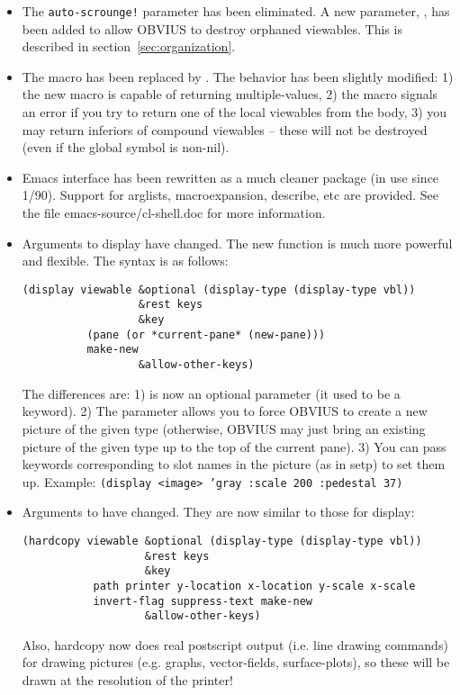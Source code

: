 \begin{itemize}
\item The {\tt *auto-scrounge!} parameter has been eliminated.  A new
parameter, , has been added to allow
OBVIUS to destroy orphaned viewables.  This is described in
section~\ref{sec:organization}.

\item The macro  has been replaced by
.  The behavior has been slightly modified:
1) the new macro is capable of returning multiple-values, 2) the macro
signals an error if you try to return one of the local viewables from
the body, 3) you may return inferiors of compound viewables -- these
will not be destroyed (even if the global symbol
 is non-nil).

\item Emacs interface has been rewritten as a much cleaner package (in use
since 1/90).  Support for arglists, macroexpansion, describe, etc are
provided.  See the file emacs-source/cl-shell.doc for more
information.

\item Arguments to display have changed.  The new function is much
more powerful and flexible.  The syntax is as follows:
\begin{verbatim}
(display viewable &optional (display-type (display-type vbl))
                  &rest keys
                  &key 
		  (pane (or *current-pane* (new-pane)))
		  make-new
                  &allow-other-keys)
\end{verbatim}
The differences are: 1)  is now an optional
parameter (it used to be a keyword).  2) The 
parameter allows you to force OBVIUS to create a new picture of the
given type (otherwise, OBVIUS may just bring an existing picture of
the given type up to the top of the current pane).  3) You can pass
keywords corresponding to slot names in the picture (as in setp) to
set them up.  Example: {\tt (display <image> 'gray :scale 200
:pedestal 37)}

\item Arguments to  have changed.  They are now similar
to those for display:
\begin{verbatim}
(hardcopy viewable &optional (display-type (display-type vbl))
                   &rest keys
                   &key
		   path printer y-location x-location y-scale x-scale
		   invert-flag suppress-text make-new
                   &allow-other-keys)
\end{verbatim}
Also, hardcopy now does real postscript output (i.e. line drawing
commands) for drawing pictures (e.g. graphs, vector-fields,
surface-plots), so these will be drawn at the resolution of the
printer!


\end{itemize}
